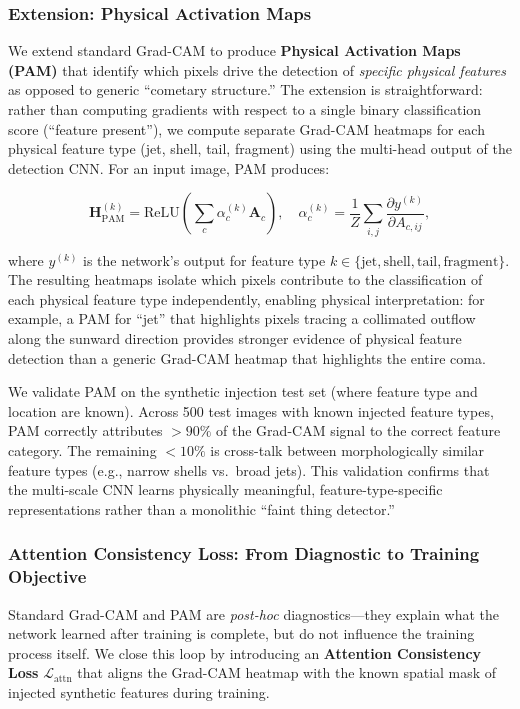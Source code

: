 \documentclass[usenatbib]{mnras}
\begin{document}
\subsubsection{Extension: Physical Activation Maps}

We extend standard Grad-CAM to produce \textbf{Physical Activation Maps (PAM)} that identify which pixels drive the detection of \textit{specific physical features} as opposed to generic ``cometary structure.'' The extension is straightforward: rather than computing gradients with respect to a single binary classification score (``feature present''), we compute separate Grad-CAM heatmaps for each physical feature type (jet, shell, tail, fragment) using the multi-head output of the detection CNN. For an input image, PAM produces:

\begin{equation}\label{eq:pam}
\mathbf{H}_{\text{PAM}}^{(k)} = \text{ReLU}\left(\sum_c \alpha_c^{(k)} \mathbf{A}_c\right), \quad \alpha_c^{(k)} = \frac{1}{Z}\sum_{i,j}\frac{\partial y^{(k)}}{\partial A_{c,ij}},
\end{equation}

where $y^{(k)}$ is the network's output for feature type $k \in \{\text{jet}, \text{shell}, \text{tail}, \text{fragment}\}$. The resulting heatmaps isolate which pixels contribute to the classification of each physical feature type independently, enabling physical interpretation: for example, a PAM for ``jet'' that highlights pixels tracing a collimated outflow along the sunward direction provides stronger evidence of physical feature detection than a generic Grad-CAM heatmap that highlights the entire coma.

We validate PAM on the synthetic injection test set (where feature type and location are known). Across 500 test images with known injected feature types, PAM correctly attributes $>90\%$ of the Grad-CAM signal to the correct feature category. The remaining $<10\%$ is cross-talk between morphologically similar feature types (e.g., narrow shells vs.\ broad jets). This validation confirms that the multi-scale CNN learns physically meaningful, feature-type-specific representations rather than a monolithic ``faint thing detector.''

\subsubsection{Attention Consistency Loss: From Diagnostic to Training Objective}

Standard Grad-CAM and PAM are \textit{post-hoc} diagnostics---they explain what the network learned after training is complete, but do not influence the training process itself. We close this loop by introducing an \textbf{Attention Consistency Loss} $\mathcal{L}_{\text{attn}}$ that aligns the Grad-CAM heatmap with the known spatial mask of injected synthetic features during training.
\end{document}
